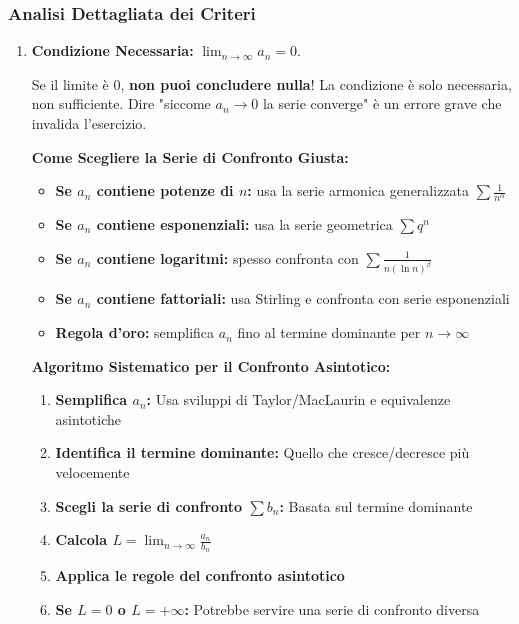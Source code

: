 \subsubsection{Analisi Dettagliata dei Criteri}
\begin{enumerate}
    \item \textbf{Condizione Necessaria:} $\lim_{n \to \infty} a_n = 0$. 
    \begin{errore}
    Se il limite è 0, \textbf{non puoi concludere nulla}! La condizione è solo necessaria, non sufficiente. Dire "siccome $a_n \to 0$ la serie converge" è un errore grave che invalida l'esercizio. 
    \end{errore}

    \begin{info}
    \textbf{Come Scegliere la Serie di Confronto Giusta:}
    \begin{itemize}
        \item \textbf{Se $a_n$ contiene potenze di $n$:} usa la serie armonica generalizzata $\sum \frac{1}{n^\alpha}$
        \item \textbf{Se $a_n$ contiene esponenziali:} usa la serie geometrica $\sum q^n$  
        \item \textbf{Se $a_n$ contiene logaritmi:} spesso confronta con $\sum \frac{1}{n (\ln n)^\beta}$
        \item \textbf{Se $a_n$ contiene fattoriali:} usa Stirling e confronta con serie esponenziali
        \item \textbf{Regola d'oro:} semplifica $a_n$ fino al termine dominante per $n \to \infty$
    \end{itemize}
    \end{info}

    \begin{strategia}
    \textbf{Algoritmo Sistematico per il Confronto Asintotico:}
    \begin{enumerate}
        \item \textbf{Semplifica $a_n$:} Usa sviluppi di Taylor/MacLaurin e equivalenze asintotiche
        \item \textbf{Identifica il termine dominante:} Quello che cresce/decresce più velocemente
        \item \textbf{Scegli la serie di confronto $\sum b_n$:} Basata sul termine dominante
        \item \textbf{Calcola $L = \lim_{n \to \infty} \frac{a_n}{b_n}$}
        \item \textbf{Applica le regole del confronto asintotico}
        \item \textbf{Se $L = 0$ o $L = +\infty$:} Potrebbe servire una serie di confronto diversa
    \end{enumerate}
    \end{strategia}


\end{enumerate}
